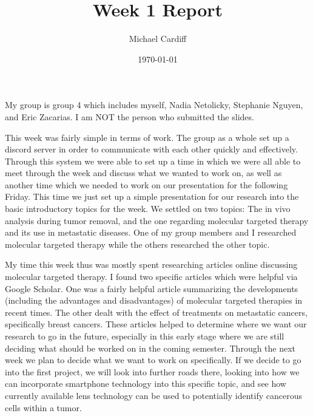 \documentclass[12pt]{article}
\title{Week 1 Report}
\author{Michael Cardiff}
\date{\today}
\begin{document}
\maketitle
My group is group 4 which includes myself, Nadia Netolicky, Stephanie Nguyen, and Eric Zacarias. I am NOT the person who submitted the slides. 

This week was fairly simple in terms of work. The group as a whole set up a discord server in order to communicate with each other quickly and effectively. Through this system we were able to set up a time in which we were all able to meet through the week and discuss what we wanted to work on, as well as another time which we needed to work on our presentation for the following Friday. This time we just set up a simple presentation for our research into the basic introductory topics for the week. We settled on two topics: The in vivo analysis during tumor removal, and the one regarding molecular targeted therapy and its use in metastatic diseases. One of my group members and I researched molecular targeted therapy while the others researched the other topic.

My time this week thus was mostly spent researching articles online discussing molecular targeted therapy. I found two specific articles which were helpful via Google Scholar. One was a fairly helpful article summarizing the developments (including the advantages and disadvantages) of molecular targeted therapies in recent times. The other dealt with the effect of treatments on metastatic cancers, specifically breast cancers. These articles helped to determine where we want our research to go in the future, especially in this early stage where we are still deciding what should be worked on in the coming semester. Through the next week we plan to decide what we want to work on specifically. If we decide to go into the first project, we will look into further roads there, looking into how we can incorporate smartphone technology into this specific topic, and see how currently available lens technology can be used to potentially identify cancerous cells within a tumor. 
\end{document}
